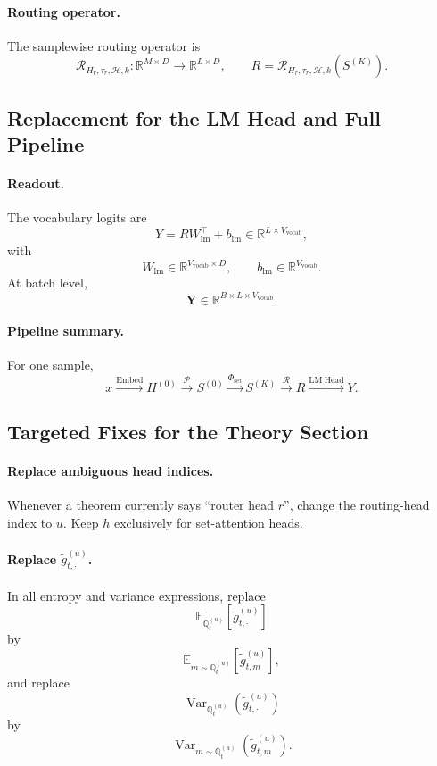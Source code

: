 \paragraph{Routing operator.}
The samplewise routing operator is
\[
\mathcal R_{H_r,\tau_r,\mathcal H,k}:\mathbb R^{M\times D}\to\mathbb R^{L\times D},
\qquad
R=\mathcal R_{H_r,\tau_r,\mathcal H,k}(S^{(K)}).
\]

\subsection*{Replacement for the LM Head and Full Pipeline}

\paragraph{Readout.}
The vocabulary logits are
\[
Y = R W_{\mathrm{lm}}^\top + b_{\mathrm{lm}}
\in \mathbb R^{L\times V_{\mathrm{vocab}}},
\]
with
\[
W_{\mathrm{lm}}\in\mathbb R^{V_{\mathrm{vocab}}\times D},
\qquad
b_{\mathrm{lm}}\in\mathbb R^{V_{\mathrm{vocab}}}.
\]
At batch level,
\[
\mathbf Y\in\mathbb R^{B\times L\times V_{\mathrm{vocab}}}.
\]

\paragraph{Pipeline summary.}
For one sample,
\[
x
\xrightarrow{\mathrm{Embed}}
H^{(0)}
\xrightarrow{\mathcal P}
S^{(0)}
\xrightarrow{\Phi_{\mathrm{set}}}
S^{(K)}
\xrightarrow{\mathcal R}
R
\xrightarrow{\mathrm{LM\ Head}}
Y.
\]

\subsection*{Targeted Fixes for the Theory Section}

\paragraph{Replace ambiguous head indices.}
Whenever a theorem currently says ``router head \(r\)'', change the routing-head
index to \(u\). Keep \(h\) exclusively for set-attention heads.

\paragraph{Replace \( \widetilde g_{t,\cdot}^{(u)} \).}
In all entropy and variance expressions, replace
\[
\mathbb E_{\mathbb Q_t^{(u)}}[\widetilde g_{t,\cdot}^{(u)}]
\]
by
\[
\mathbb E_{m\sim\mathbb Q_t^{(u)}}[\widetilde g_{t,m}^{(u)}],
\]
and replace
\[
\operatorname{Var}_{\mathbb Q_t^{(u)}}(\widetilde g_{t,\cdot}^{(u)})
\]
by
\[
\operatorname{Var}_{m\sim\mathbb Q_t^{(u)}}(\widetilde g_{t,m}^{(u)}).
\]

